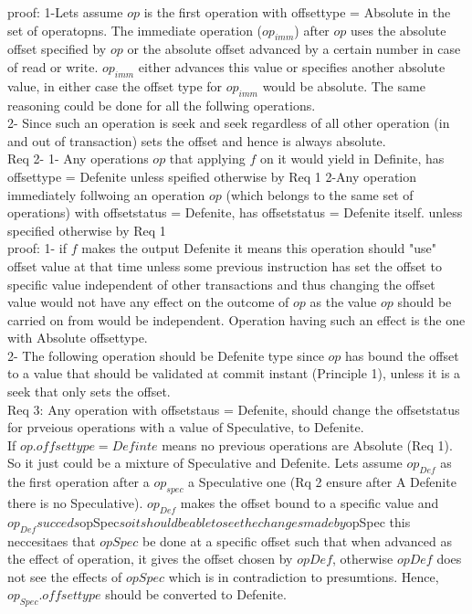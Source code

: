 \documentclass[a4paper, 11pt]{article}
\begin{document}
proof: 1-Lets assume $op$ is the first operation with offsettype = Absolute in the set of operatopns. The immediate operation ($op_{imm}$) after $op$ uses the absolute offset specified by $op$ or the absolute offset advanced by a certain number in case of read or write. $op_{imm}$ either advances this value or specifies another absolute value, in either case the offset type for $op_{imm}$ would be absolute. The same reasoning could be done for all the follwing operations.\\

2- Since such an operation is seek and seek regardless of all other operation (in and out of transaction) sets the offset and hence is always absolute.\\

Req 2- 1- Any operations $op$ that applying $f$ on it would yield in Definite, has offsettype = Defenite unless speified otherwise by Req 1  2-Any operation immediately follwoing an operation $op$ (which belongs to the same set of operations) with offsetstatus = Defenite, has offsetstatus = Defenite itself. unless specified otherwise by Req 1\\

proof: 1- if $f$ makes the output Defenite it means this operation should "use" offset value at that time unless some previous instruction has set the offset to specific value independent of other transactions and thus changing the offset value would not have any effect on the outcome of $op$ as the value $op$ should be carried on from would be independent. Operation having such an effect is the one with Absolute offsettype.\\

2- The following operation should be Defenite type since $op$ has bound the offset to a value that should be validated at commit instant (Principle 1), unless it is a seek that only sets the offset.\\ 

Req 3: Any operation with offsetstaus = Defenite, should change the offsetstatus for prveious operations with a value of Speculative, to Defenite.\\

If $op.offsettype = Definte$ means no previous operations are Absolute (Req 1). So it just could be a mixture of Speculative and Defenite. Lets assume $op_{Def}$ as the first operation after a $op_{spec}$ a Speculative one (Rq 2 ensure after A Defenite there is no Speculative).  $op_{Def}$ makes the offset bound to a specific value and $op_{Def} succeds $op{Spec}$ so it should be able to see the changes made by $op{Spec} this neccesitaes that $op{Spec}$ be done at a specific offset such that when advanced as the effect of operation, it gives the offset chosen by $op{Def}$, otherwise $op{Def}$ does not see the effects of $op{Spec}$ which is in contradiction to presumtions. Hence, $op_{Spec}.offsettype$ should be converted to Defenite.\\
\end{document}
